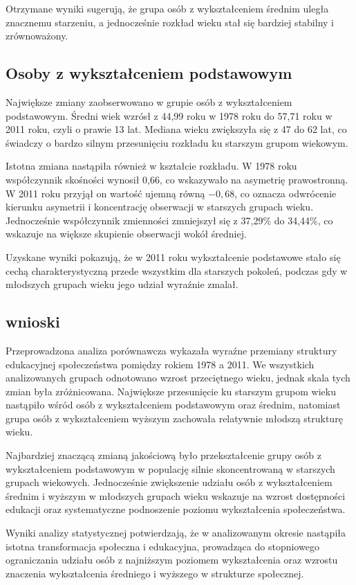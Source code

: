 \documentclass[10pt]{article}
\begin{document}
Otrzymane wyniki sugerują, że grupa osób z wykształceniem średnim uległa znacznemu starzeniu, a jednocześnie rozkład wieku stał się bardziej stabilny i zrównoważony.

\subsection{Osoby z wykształceniem podstawowym}

Największe zmiany zaobserwowano w grupie osób z wykształceniem podstawowym. Średni wiek wzrósł z 44{,}99 roku w 1978 roku do 57{,}71 roku w 2011 roku, czyli o prawie 13 lat. Mediana wieku zwiększyła się z 47 do 62 lat, co świadczy o bardzo silnym przesunięciu rozkładu ku starszym grupom wiekowym.

Istotna zmiana nastąpiła również w kształcie rozkładu. W 1978 roku współczynnik skośności wynosił 0{,}66, co wskazywało na asymetrię prawostronną. W 2011 roku przyjął on wartość ujemną równą $-0{,}68$, co oznacza odwrócenie kierunku asymetrii i koncentrację obserwacji w starszych grupach wieku. Jednocześnie współczynnik zmienności zmniejszył się z 37{,}29\% do 34{,}44\%, co wskazuje na większe skupienie obserwacji wokół średniej.

Uzyskane wyniki pokazują, że w 2011 roku wykształcenie podstawowe stało się cechą charakterystyczną przede wszystkim dla starszych pokoleń, podczas gdy w młodszych grupach wieku jego udział wyraźnie zmalał.

\subsection{wnioski}

Przeprowadzona analiza porównawcza wykazała wyraźne przemiany struktury edukacyjnej społeczeństwa pomiędzy rokiem 1978 a 2011. We wszystkich analizowanych grupach odnotowano wzrost przeciętnego wieku, jednak skala tych zmian była zróżnicowana. Największe przesunięcie ku starszym grupom wieku nastąpiło wśród osób z wykształceniem podstawowym oraz średnim, natomiast grupa osób z wykształceniem wyższym zachowała relatywnie młodszą strukturę wieku.

Najbardziej znaczącą zmianą jakościową było przekształcenie grupy osób z wykształceniem podstawowym w populację silnie skoncentrowaną w starszych grupach wiekowych. Jednocześnie zwiększenie udziału osób z wykształceniem średnim i wyższym w młodszych grupach wieku wskazuje na wzrost dostępności edukacji oraz systematyczne podnoszenie poziomu wykształcenia społeczeństwa.

Wyniki analizy statystycznej potwierdzają, że w analizowanym okresie nastąpiła istotna transformacja społeczna i edukacyjna, prowadząca do stopniowego ograniczania udziału osób z najniższym poziomem wykształcenia oraz wzrostu znaczenia wykształcenia średniego i wyższego w strukturze społecznej.
\end{document}
